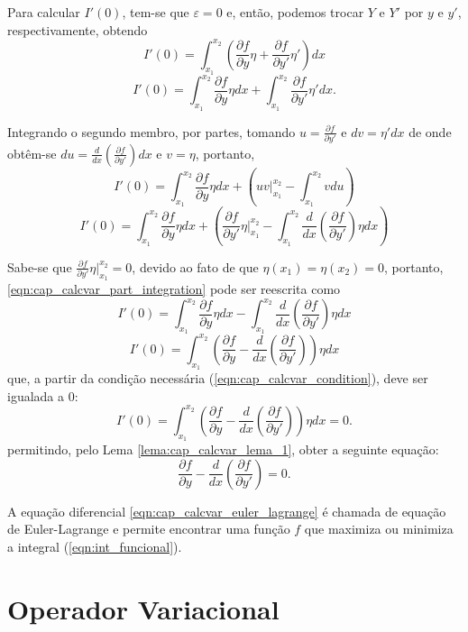 \documentclass[
	12pt,				%
	openright,			%
    twoside,			%
	a4paper,			%
	english,			%
	french,				%
	spanish,			%
	brazil				%
	]{abntex2}
\numberwithin{lema}{chapter}
\numberwithin{teorema}{chapter}
\numberwithin{definicao}{chapter}
\numberwithin{figure}{chapter}
\begin{document}
Para calcular $I'(0)$, tem-se que $\varepsilon=0$ e, então, podemos trocar $Y$ e $Y'$ por $y$ e $y'$, respectivamente, obtendo
$$
I'(0)=\int_{x_1}^{x_2}\left (
	\frac{\partial f}{\partial y} \eta +
	\frac{\partial f}{\partial y'} \eta '
\right )dx
$$
$$
I'(0)=
	\int_{x_1}^{x_2} \frac{\partial f}{\partial y}\eta dx
	+
	\int_{x_1}^{x_2} \frac{\partial f}{\partial y'}\eta' dx \text{.}
$$

Integrando o segundo membro, por partes, tomando $u=\frac{\partial f}{\partial y'}$ e $dv=\eta'dx$ de onde obtêm-se $du=\frac{d}{dx}\left ( \frac{\partial f}{\partial y'} \right )dx$ e $v=\eta$, portanto,
$$
I'(0)=
	\int_{x_1}^{x_2} \frac{\partial f}{\partial y}\eta dx
	+
	\left (
	uv \Big|_{x_1}^{x_2} - \int_{x_1}^{x_2}vdu
	\right )
$$
\begin{equation}\label{eqn:cap_calcvar_part_integration}
I'(0)=
	\int_{x_1}^{x_2} \frac{\partial f}{\partial y}\eta dx
	+
	\left (
		\frac{\partial f}{\partial y'}\eta \Biggr|_{x_1}^{x_2} - \int_{x_1}^{x_2} \frac{d}{dx}\left ( \frac{\partial f}{\partial y'} \right ) \eta dx
	\right )
\end{equation}

Sabe-se que $\frac{\partial f}{\partial y'}\eta \Big |_{x_1}^{x_2}=0$, devido ao fato de que $\eta(x_1)=\eta(x_2)=0$, portanto, \eqref{eqn:cap_calcvar_part_integration} pode ser reescrita como
$$
I'(0)=
	\int_{x_1}^{x_2} \frac{\partial f}{\partial y}\eta dx
	-
	\int_{x_1}^{x_2} \frac{d}{dx} \left ( \frac{\partial f}{\partial y'} \right ) \eta dx
$$
$$
I'(0)=\int_{x_1}^{x_2}\left (
	\frac{\partial f}{\partial y} -
	\frac{d}{dx}
	\left (
		\frac{\partial f}{\partial y'}
	\right )
\right )\eta dx
$$
que, a partir da condição necessária (\ref{eqn:cap_calcvar_condition}), deve ser igualada a $0$:
$$
I'(0)=\int_{x_1}^{x_2}\left (
	\frac{\partial f}{\partial y} -
	\frac{d}{dx}
	\left (
		\frac{\partial f}{\partial y'}
	\right )
\right )\eta dx = 0	\text{.}
$$
permitindo, pelo Lema \ref{lema:cap_calcvar_lema_1}, obter a seguinte equação:
\begin{equation}\label{eqn:cap_calcvar_euler_lagrange}
\frac{\partial f}{\partial y} - \frac{d}{dx} \left ( \frac{\partial f}{\partial y'} \right )=0 \text{.}
\end{equation}

A equação diferencial \eqref{eqn:cap_calcvar_euler_lagrange} é chamada de equação de Euler-Lagrange e permite encontrar uma função $f$ que maximiza ou minimiza a integral (\ref{eqn:int_funcional}).

\section{Operador Variacional}
\end{document}
